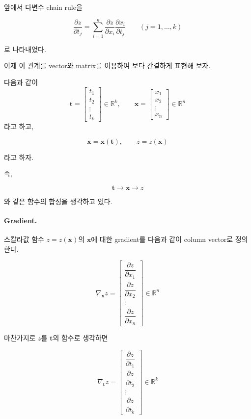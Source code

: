 \documentclass[11pt,a4paper]{article}
\begin{document}
앞에서 다변수 chain rule을

\[
\boxed{
\frac{\partial z}{\partial t_j}
=
\sum_{i=1}^{n}
\frac{\partial z}{\partial x_i}
\frac{\partial x_i}{\partial t_j}
}
\qquad
(j=1,\ldots,k)
\]

로 나타내었다.

이제 이 관계를 vector와 matrix를 이용하여 보다 간결하게 표현해 보자.

다음과 같이
\[
\mathbf t
=
\begin{bmatrix}
t_1\\
t_2\\
\vdots\\
t_k
\end{bmatrix}
\in\mathbb R^k,
\qquad
\mathbf x
=
\begin{bmatrix}
x_1\\
x_2\\
\vdots\\
x_n
\end{bmatrix}
\in\mathbb R^n
\]
라고 하고,

\[
\mathbf x=\mathbf x(\mathbf t),
\qquad
z=z(\mathbf x)
\]

라고 하자.

즉,

\[
\mathbf t
\longrightarrow
\mathbf x
\longrightarrow
z
\]

와 같은 함수의 합성을 생각하고 있다.


\paragraph{Gradient.}

스칼라값 함수 $z=z(\mathbf x)$의 $\mathbf x$에 대한 gradient를
다음과 같이 column vector로 정의한다.

\[
\boxed{
\nabla_{\mathbf x}z
=
\begin{bmatrix}
\dfrac{\partial z}{\partial x_1}\\[0.6em]
\dfrac{\partial z}{\partial x_2}\\
\vdots\\
\dfrac{\partial z}{\partial x_n}
\end{bmatrix}
\in\mathbb R^n
}
\]

마찬가지로 $z$를 $\mathbf t$의 함수로 생각하면

\[
\boxed{
\nabla_{\mathbf t}z
=
\begin{bmatrix}
\dfrac{\partial z}{\partial t_1}\\[0.6em]
\dfrac{\partial z}{\partial t_2}\\
\vdots\\
\dfrac{\partial z}{\partial t_k}
\end{bmatrix}
\in\mathbb R^k
}
\]
\end{document}
